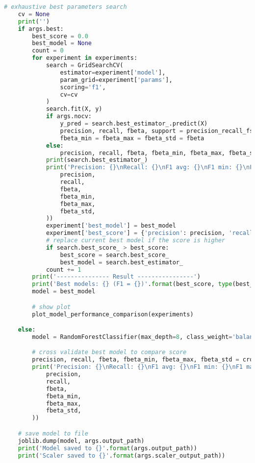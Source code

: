 \begin{lstlisting}[language=Python]
    # exhaustive best parameters search
    cv = None
    print('')
    if args.best:
        best_score = 0.0
        best_model = None
        count = 0
        for experiment in experiments:
            search = GridSearchCV(
                estimator=experiment['model'],
                param_grid=experiment['params'],
                scoring='f1',
                cv=cv
            )
            search.fit(X, y)
            if args.nocv:
                y_pred = search.best_estimator_.predict(X)
                precision, recall, fbeta, support = precision_recall_fscore_support(y, y_pred, average='binary')
                fbeta_min = fbeta_max = fbeta_std = fbeta
            else:
                precision, recall, fbeta, fbeta_min, fbeta_max, fbeta_std = cross_validate_precision_recall_fbeta(search.best_estimator_, X, y)
            print(search.best_estimator_)
            print('Precision: {}\nRecall: {}\nF1 avg: {}\nF1 min: {}\nF1 max: {}\nF1 std: {}\n'.format(
                precision,
                recall,
                fbeta,
                fbeta_min,
                fbeta_max,
                fbeta_std,
            ))
            experiment['best_model'] = best_model
            experiment['best_score'] = {'precision': precision, 'recall': recall, 'f1': fbeta}
            # replace current best model if the score is higher
            if search.best_score_ > best_score:
                best_score = search.best_score_
                best_model = search.best_estimator_
            count += 1
        print('--------------- Result ----------------')
        print('Best models: {} (F1 = {})'.format(best_score, type(best_model).__name__))
        model = best_model

        # show plot
        plot_model_performance_comparison(experiments)

    else:
        model = RandomForestClassifier(max_depth=8, class_weight='balanced', n_estimators=20, min_samples_split=5, max_features='auto', random_state=77)

        # cross validate best model to compare score
        precision, recall, fbeta, fbeta_min, fbeta_max, fbeta_std = cross_validate_precision_recall_fbeta(model, X, y)
        print('Precision: {}\nRecall: {}\nF1 avg: {}\nF1 min: {}\nF1 max: {}\nF1 std: {}\n'.format(
            precision,
            recall,
            fbeta,
            fbeta_min,
            fbeta_max,
            fbeta_std,
        ))

    # save model to file
    joblib.dump(model, args.output_path)
    print('Model saved to {}'.format(args.output_path))
    print('Scaler saved to {}'.format(args.scaler_output_path))
\end{lstlisting}